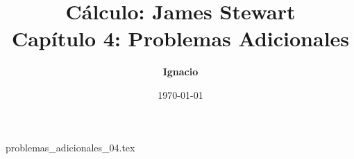 \documentclass[11pt,spanish,oneside]{report}
\title{\textbf{Cálculo: James Stewart} \\ \Large Capítulo 4: Problemas Adicionales}
\author{\textbf{Ignacio}}
\date{\today}
\begin{document}
\maketitle

{problemas_adicionales_04.tex}
\end{document}
